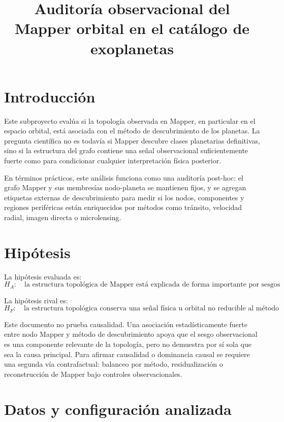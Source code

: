 \documentclass[11pt]{article}
\title{Auditoría observacional del Mapper orbital en el catálogo de exoplanetas}
\author{}
\date{}
\begin{document}
\maketitle

\section{Introducción}

Este subproyecto evalúa si la topología observada en Mapper, en particular en el espacio orbital, está asociada con el método de descubrimiento de los planetas. La pregunta científica no es todavía si Mapper descubre clases planetarias definitivas, sino si la estructura del grafo contiene una señal observacional suficientemente fuerte como para condicionar cualquier interpretación física posterior.

En términos prácticos, este análisis funciona como una auditoría post-hoc: el grafo Mapper y sus membresías nodo-planeta se mantienen fijos, y se agregan etiquetas externas de descubrimiento para medir si los nodos, componentes y regiones periféricas están enriquecidos por métodos como tránsito, velocidad radial, imagen directa o microlensing.

\section{Hipótesis}

La hipótesis evaluada es:
\[
H_A: \quad \text{la estructura topológica de Mapper está explicada de forma importante por sesgos de observación y método de descubrimiento.}
\]

La hipótesis rival es:
\[
H_F: \quad \text{la estructura topológica conserva una señal física u orbital no reducible al método de descubrimiento.}
\]

Este documento no prueba causalidad. Una asociación estadísticamente fuerte entre nodo Mapper y método de descubrimiento apoya que el sesgo observacional es una componente relevante de la topología, pero no demuestra por sí sola que sea la causa principal. Para afirmar causalidad o dominancia causal se requiere una segunda vía contrafactual: balanceo por método, residualización o reconstrucción de Mapper bajo controles observacionales.

\section{Datos y configuración analizada}
\end{document}
